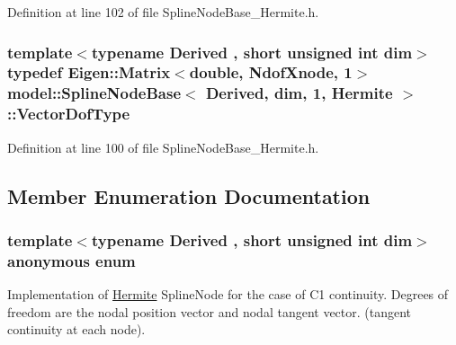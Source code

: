 Definition at line 102 of file Spline\+Node\+Base\+\_\+\+Hermite.\+h.

\hypertarget{classmodel_1_1_spline_node_base_3_01_derived_00_01dim_00_011_00_01_hermite_01_4_aca76e4dc4ac650d8fc7ae0b4c2bfa115}{}
\subsubsection[{Vector\+Dof\+Type}]{\setlength{\rightskip}{0pt plus 5cm}template$<$typename Derived , short unsigned int dim$>$ typedef Eigen\+::\+Matrix$<$double, {\bf Ndof\+Xnode}, 1$>$ {\bf model\+::\+Spline\+Node\+Base}$<$ Derived, {\bf dim}, 1, {\bf Hermite} $>$\+::{\bf Vector\+Dof\+Type}}\label{classmodel_1_1_spline_node_base_3_01_derived_00_01dim_00_011_00_01_hermite_01_4_aca76e4dc4ac650d8fc7ae0b4c2bfa115}


Definition at line 100 of file Spline\+Node\+Base\+\_\+\+Hermite.\+h.



\subsection{Member Enumeration Documentation}
\hypertarget{classmodel_1_1_spline_node_base_3_01_derived_00_01dim_00_011_00_01_hermite_01_4_ae1513c5d17dffb4fea771491defe54b3}{}\subsubsection[{anonymous enum}]{\setlength{\rightskip}{0pt plus 5cm}template$<$typename Derived , short unsigned int dim$>$ anonymous enum}\label{classmodel_1_1_spline_node_base_3_01_derived_00_01dim_00_011_00_01_hermite_01_4_ae1513c5d17dffb4fea771491defe54b3}


Implementation of \hyperlink{classmodel_1_1_hermite}{Hermite} Spline\+Node for the case of C1 continuity. Degrees of freedom are the nodal position vector and nodal tangent vector. (tangent continuity at each node). 

